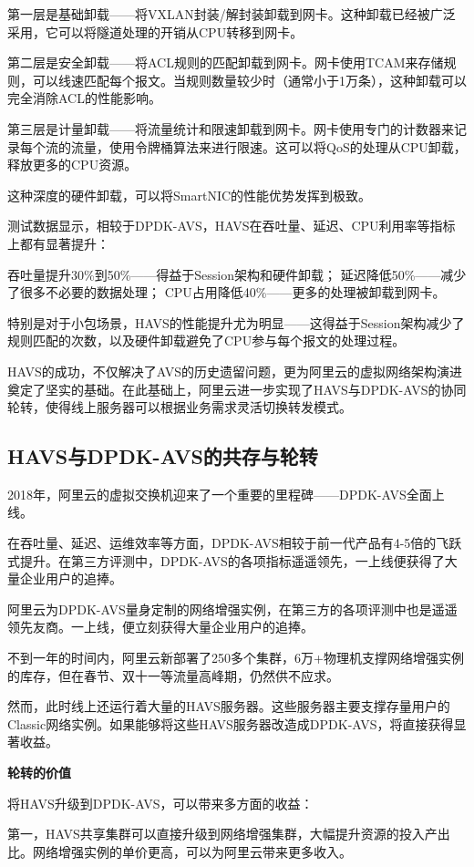 第一层是基础卸载——将VXLAN封装/解封装卸载到网卡。这种卸载已经被广泛采用，它可以将隧道处理的开销从CPU转移到网卡。

第二层是安全卸载——将ACL规则的匹配卸载到网卡。网卡使用TCAM来存储规则，可以线速匹配每个报文。当规则数量较少时（通常小于1万条），这种卸载可以完全消除ACL的性能影响。

第三层是计量卸载——将流量统计和限速卸载到网卡。网卡使用专门的计数器来记录每个流的流量，使用令牌桶算法来进行限速。这可以将QoS的处理从CPU卸载，释放更多的CPU资源。

这种深度的硬件卸载，可以将SmartNIC的性能优势发挥到极致。

测试数据显示，相较于DPDK-AVS，HAVS在吞吐量、延迟、CPU利用率等指标上都有显著提升：

吞吐量提升30\%到50\%——得益于Session架构和硬件卸载；
延迟降低50\%——减少了很多不必要的数据处理；
CPU占用降低40\%——更多的处理被卸载到网卡。

特别是对于小包场景，HAVS的性能提升尤为明显——这得益于Session架构减少了规则匹配的次数，以及硬件卸载避免了CPU参与每个报文的处理过程。

HAVS的成功，不仅解决了AVS的历史遗留问题，更为阿里云的虚拟网络架构演进奠定了坚实的基础。在此基础上，阿里云进一步实现了HAVS与DPDK-AVS的协同轮转，使得线上服务器可以根据业务需求灵活切换转发模式。

\subsection{HAVS与DPDK-AVS的共存与轮转}

2018年，阿里云的虚拟交换机迎来了一个重要的里程碑——DPDK-AVS全面上线。

在吞吐量、延迟、运维效率等方面，DPDK-AVS相较于前一代产品有4-5倍的飞跃式提升。在第三方评测中，DPDK-AVS的各项指标遥遥领先，一上线便获得了大量企业用户的追捧。

阿里云为DPDK-AVS量身定制的网络增强实例，在第三方的各项评测中也是遥遥领先友商。一上线，便立刻获得大量企业用户的追捧。

不到一年的时间内，阿里云新部署了250多个集群，6万+物理机支撑网络增强实例的库存，但在春节、双十一等流量高峰期，仍然供不应求。

然而，此时线上还运行着大量的HAVS服务器。这些服务器主要支撑存量用户的Classic网络实例。如果能够将这些HAVS服务器改造成DPDK-AVS，将直接获得显著收益。

\textbf{轮转的价值}

将HAVS升级到DPDK-AVS，可以带来多方面的收益：

第一，HAVS共享集群可以直接升级到网络增强集群，大幅提升资源的投入产出比。网络增强实例的单价更高，可以为阿里云带来更多收入。

